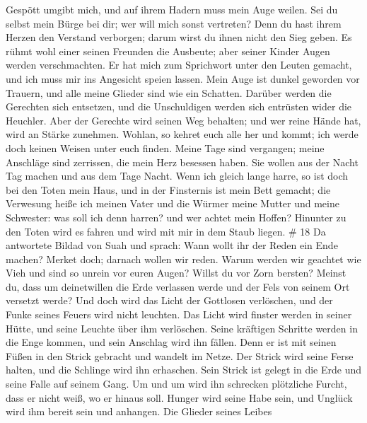 Gespött umgibt mich, und auf ihrem Hadern muss mein Auge weilen.
 Sei du selbst mein Bürge bei dir; wer will mich sonst
vertreten?  Denn du hast ihrem Herzen den Verstand
verborgen; darum wirst du ihnen nicht den Sieg geben.  Es
rühmt wohl einer seinen Freunden die Ausbeute; aber seiner Kinder Augen
werden verschmachten.  Er hat mich zum Sprichwort unter den
Leuten gemacht, und ich muss mir ins Angesicht speien lassen.
 Mein Auge ist dunkel geworden vor Trauern, und alle meine
Glieder sind wie ein Schatten.  Darüber werden die Gerechten
sich entsetzen, und die Unschuldigen werden sich entrüsten wider die
Heuchler.  Aber der Gerechte wird seinen Weg behalten; und
wer reine Hände hat, wird an Stärke zunehmen.  Wohlan, so
kehret euch alle her und kommt; ich werde doch keinen Weisen unter euch
finden.  Meine Tage sind vergangen; meine Anschläge sind
zerrissen, die mein Herz besessen haben.  Sie wollen aus
der Nacht Tag machen und aus dem Tage Nacht.  Wenn ich
gleich lange harre, so ist doch bei den Toten mein Haus, und in der
Finsternis ist mein Bett gemacht;  die Verwesung heiße ich
meinen Vater und die Würmer meine Mutter und meine Schwester:
 was soll ich denn harren? und wer achtet mein Hoffen?
 Hinunter zu den Toten wird es fahren und wird mit mir in
dem Staub liegen. \# 18  Da antwortete Bildad von Suah und
sprach:  Wann wollt ihr der Reden ein Ende machen? Merket
doch; darnach wollen wir reden.  Warum werden wir geachtet
wie Vieh und sind so unrein vor euren Augen?  Willst du vor
Zorn bersten? Meinst du, dass um deinetwillen die Erde verlassen werde
und der Fels von seinem Ort versetzt werde?  Und doch wird
das Licht der Gottlosen verlöschen, und der Funke seines Feuers wird
nicht leuchten.  Das Licht wird finster werden in seiner
Hütte, und seine Leuchte über ihm verlöschen.  Seine
kräftigen Schritte werden in die Enge kommen, und sein Anschlag wird ihn
fällen.  Denn er ist mit seinen Füßen in den Strick gebracht
und wandelt im Netze.  Der Strick wird seine Ferse halten,
und die Schlinge wird ihn erhaschen.  Sein Strick ist
gelegt in die Erde und seine Falle auf seinem Gang.  Um und
um wird ihn schrecken plötzliche Furcht, dass er nicht weiß, wo er
hinaus soll.  Hunger wird seine Habe sein, und Unglück wird
ihm bereit sein und anhangen.  Die Glieder seines Leibes
